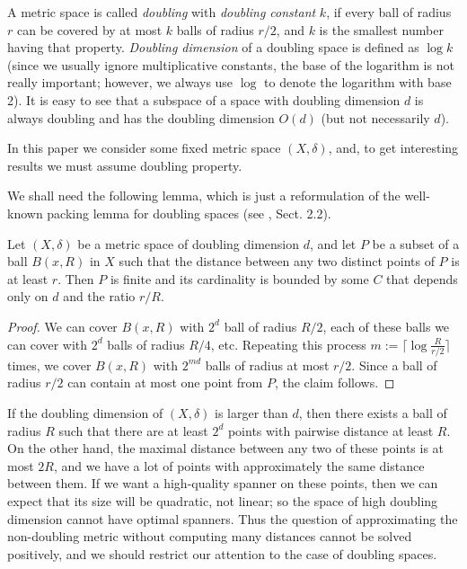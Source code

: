 \documentclass[a4paper,USenglish]{socg-lipics-v2018}
\newcommand{\dist}{\delta}
\begin{document}
A metric space is called \textit{doubling} with \textit{doubling constant} $k$,
if every ball of radius $r$ can be covered by at most $k$ balls of radius $r/2$,
and $k$ is the smallest number having that property.
\textit{Doubling dimension} of a doubling space is defined as $\log k$
(since we usually ignore multiplicative constants, the base of the logarithm is not really important; however,
we always use $\log$ to denote the logarithm with base 2).
It is easy to see that a subspace of a space with doubling dimension $d$ 
is always doubling and has the doubling dimension $O(d)$ (but not necessarily $d$).


In this paper we consider some fixed metric space $(X, \dist)$, and, to get interesting
results we must assume doubling property.

We shall need the following lemma, which is just a reformulation of the well-known
packing lemma for doubling spaces (see \cite{smid_2009}, Sect. 2.2).

\begin{lemma}
\label{lem:packing_lemma}
 Let $(X,\dist)$ be a metric space of doubling dimension $d$, and let $P$ be a subset of a ball 
 $B(x,R)$ in $X$ such that the distance between any two distinct points of $P$ is at least $r$.
 Then $P$ is finite and its cardinality is bounded by some $C$ that depends only on $d$
 and the ratio $r/R$.

\end{lemma}
\begin{proof}
We can cover $B(x,R)$ with $2^d$ ball of radius $R/2$, each of these balls we can cover with $2^d$
balls of radius $R/4$, etc. Repeating this process $m := \lceil \log \frac{R}{r/2} \rceil$ times, 
we cover
$B(x, R)$ with $2^{md}$ balls of radius at most $r/2$. Since a ball of radius $r/2$ can
contain at most one point from $P$, the claim follows.
\end{proof}
If the doubling dimension of $(X, \dist)$ is larger than $d$, then
there exists a ball of radius $R$ such that there are at least $2^d$ points with pairwise distance at least $R$. On the other hand,
the maximal distance between any two of these points is at most $2R$, and we have a lot of points with approximately the same distance
between them. If we want a high-quality spanner on these points, then we can expect that its size will be quadratic, not linear;
so the space of high doubling dimension cannot have optimal spanners. Thus the question of approximating
the non-doubling metric without computing many distances cannot be solved positively, and we should
restrict our attention to the case of doubling spaces.
\end{document}
